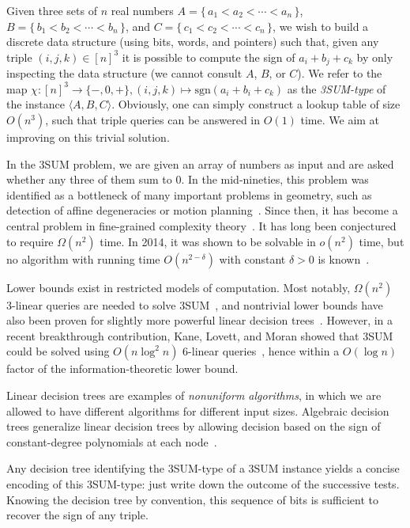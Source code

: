 Given three sets of \(n\) real numbers
\(A = \{\, a_1 < a_2 < \cdots < a_n\,\} \),
\(B = \{\, b_1 < b_2 < \cdots < b_n\,\} \),
and \(C = \{\, c_1 < c_2 < \cdots < c_n\,\}\),
we wish to build a discrete data structure (using bits, words, and pointers) such that,
given any triple \((i,j,k) \in {[n]}^3\) it is possible to compute the sign of
\(a_i + b_j + c_k\) by only inspecting the data structure (we cannot consult
\(A\), \(B\), or \(C\)).
We refer to the map $\chi : {[n]}^3\to \{-,0,+\}, (i,j,k)\mapsto\mathrm{sgn}
(a_i+b_i+c_k)$ as the {\em 3SUM-type} of the instance $\langle A,B,C \rangle$.
Obviously, one can simply construct a lookup table of size \(O(n^3)\), such
that triple queries can be answered in \(O(1)\) time. We aim at improving on
this trivial solution.

In the 3SUM problem, we are given an array of numbers as input and are asked
whether any three of them sum to 0. In the mid-nineties, this problem was
identified as a bottleneck of many
important problems in geometry, such as detection of affine degeneracies or
motion planning~\cite{GO95}. Since then, it has become a central problem in
fine-grained complexity theory~\cite{PW10}. It has long been conjectured to
require $\Omega (n^2)$ time. In 2014, it was shown to be solvable in $o(n^2)$
time, but no algorithm with running time $O(n^{2-\delta})$ with constant
$\delta>0$ is known~\cite{GP18}.

Lower bounds exist in restricted models of computation. Most notably,
$\Omega(n^2)$ 3-linear queries are needed to solve 3SUM~\cite{Er99a},
and nontrivial lower bounds have also been proven for slightly more powerful linear
decision trees~\cite{AC05}. However, in a recent breakthrough contribution, Kane, Lovett,
and Moran showed that 3SUM could be solved using $O(n\log^2 n)$
6-linear queries~\cite{KLM18}, hence within a $O(\log n)$ factor of the
information-theoretic lower bound.

Linear decision trees are examples of {\em nonuniform algorithms}, in which we
are allowed to have different algorithms for different input sizes.
Algebraic decision trees generalize linear decision trees
by allowing decision based on the sign of constant-degree polynomials at each
node~\cite{SY82}.

Any decision tree identifying the 3SUM-type of a 3SUM instance yields a concise
encoding of this 3SUM-type:
just write down the outcome of the successive tests. Knowing the decision tree
by convention, this sequence of bits is
sufficient to recover the sign of any triple.

